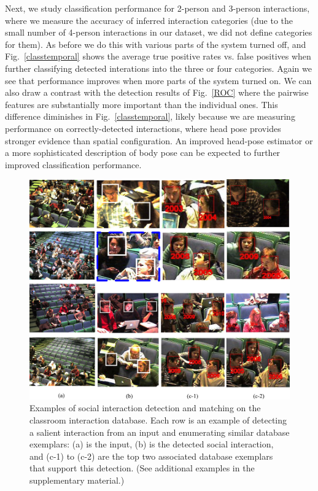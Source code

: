 Next, we study classification performance for 2-person and 3-person interactions, where we measure the accuracy of inferred interaction categories (due to the small number of 4-person interactions in our dataset, we did not define categories for them). As before we do this with various parts of the system turned off, and Fig.~\ref{classtemporal} shows the average true positive rates vs. false positives when further classifying detected interations into the three or four categories. Again we see that performance improves when more parts of the system turned on. We can also draw a contrast with the detection results of Fig.~\ref{ROC} where the pairwise features are substantially more important than the individual ones. This difference diminishes in Fig.~\ref{classtemporal}, likely because we are measuring performance on correctly-detected interactions, where head pose provides stronger evidence than spatial configuration. An improved head-pose estimator or a more sophisticated description of body pose can be expected to further improved classification performance.


\begin{figure}
\vspace{-5pt}
\begin{center}
\includegraphics[width=\columnwidth]{retrieved_p.png}
\end{center}
\vspace{-10pt}
\caption{Examples of social interaction detection and matching on the classroom interaction database. Each row is an example of detecting a salient interaction from an input and enumerating similar database exemplars: (a) is the input, (b) is the detected social interaction, and (c-1) to (c-2) are the top two associated database exemplars that support this detection. (See additional examples in the supplementary material.)}
\label{retrieved}
\vspace{-5pt}
\end{figure}


